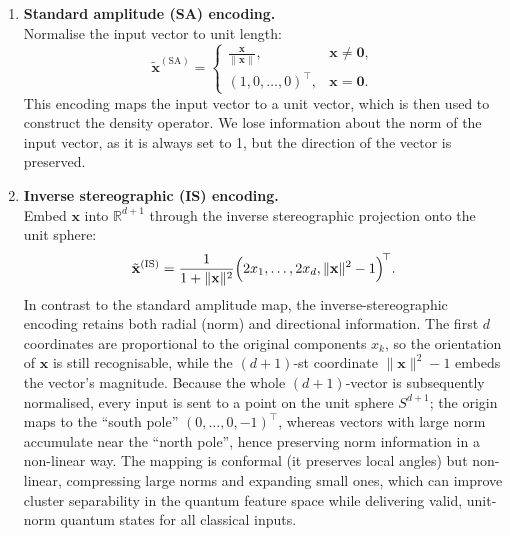 \documentclass[twocolumn]{article} %
\begin{document}
\begin{enumerate}[leftmargin=*,label=\textbf{(\alph*)}]
\item \textbf{Standard amplitude (SA) encoding.}\\[2pt]
      Normalise the input vector to unit length:
      \[
        \tilde{\mathbf x}^{(\mathrm{SA})}
          =\begin{cases}
             \displaystyle\frac{\mathbf x}{\lVert\mathbf x\rVert},
               &\mathbf x\neq\mathbf 0,\\[6pt]
             (1,0,\dots,0)^{\!\top},&\mathbf x=\mathbf 0.
           \end{cases}
      \]
      This encoding maps the input vector to a unit vector, which is then used to construct the density operator. 
      We lose information about the norm of the input vector, as it is always set to 1, but the direction of the vector is preserved.

\item \textbf{Inverse stereographic (IS) encoding.}\\[2pt]
      Embed \(\mathbf x\) into \(\mathbb R^{d+1}\) through the inverse
      stereographic projection onto the unit sphere:
      \[
        \tilde{\mathbf x}^{(\mathrm{IS})}
           =\frac{1}
                  {1+\lVert\mathbf x\rVert^{2}}
             \Bigl(2x_{1},\dots,2x_{d},
                   \lVert\mathbf x\rVert^{2}-1\Bigr)^{\!\top}.
      \]
        In contrast to the standard amplitude map, the inverse-stereographic encoding retains both radial (norm) and directional information.
        The first \(d\) coordinates are proportional to the original components \(x_{k}\), so the orientation of \(\mathbf x\) is still recognisable, while the \((d+1)\)-st coordinate \(\lVert\mathbf x\rVert^{2}-1\) embeds the vector's magnitude.  
        Because the whole \((d+1)\)-vector is subsequently normalised, every input is sent to a point on the unit sphere \(S^{d+1}\); the origin maps to the “south pole” \((0,\dots,0,-1)^{\top}\), whereas vectors with large norm accumulate near the “north pole”, hence preserving norm information in a non-linear way. 
        The mapping is conformal (it preserves local angles) but non-linear, compressing large norms and expanding small ones, which can improve cluster separability in the quantum feature space while delivering valid, unit-norm quantum states for all classical inputs.



\end{enumerate}
\end{document}
